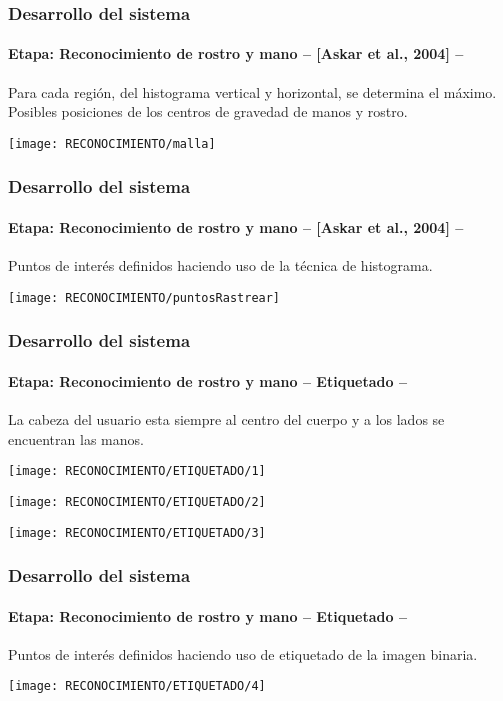\documentclass[xcolor=dvipsnames]{beamer}
\begin{document}
	\begin{frame}
		\transdissolve
		\frametitle{Desarrollo del sistema}
		\framesubtitle{Etapa: Reconocimiento de rostro y mano -- {[}Askar et al., 2004{]} --}
		{\small{Para cada región, del histograma vertical y horizontal, se determina el máximo. Posibles posiciones de los centros de gravedad de manos y rostro.}}
		\begin{center}
			\texttt{[image: RECONOCIMIENTO/malla]}
		\end{center}
	\end{frame}

	\begin{frame}
		\transdissolve
		\frametitle{Desarrollo del sistema}
		\framesubtitle{Etapa: Reconocimiento de rostro y mano -- {[}Askar et al., 2004{]} --}
		{\small{Puntos de interés definidos haciendo uso de la técnica de histograma.}}
		\begin{center}
			\texttt{[image: RECONOCIMIENTO/puntosRastrear]}
		\end{center}
	\end{frame}

	\begin{frame}
		\transdissolve
		\frametitle{Desarrollo del sistema}
		\framesubtitle{Etapa: Reconocimiento de rostro y mano -- Etiquetado --}
		{\small{La cabeza del usuario esta siempre al centro del cuerpo y a los lados se encuentran las manos.}}
		\begin{center}
			\begin{minipage}[c]{.47\textwidth}
				\begin{center}
				\texttt{[image: RECONOCIMIENTO/ETIQUETADO/1]}
				\end{center}
			\end{minipage}
			\begin{minipage}[c]{.47\textwidth}
				\begin{center}
				\texttt{[image: RECONOCIMIENTO/ETIQUETADO/2]}
				\end{center}
			\end{minipage}
			\texttt{[image: RECONOCIMIENTO/ETIQUETADO/3]}
		\end{center}
	\end{frame}

	\begin{frame}
		\transdissolve
		\frametitle{Desarrollo del sistema}
		\framesubtitle{Etapa: Reconocimiento de rostro y mano -- Etiquetado --}
		{\small{Puntos de interés definidos haciendo uso de etiquetado de la imagen binaria.}}
		\begin{center}
			\texttt{[image: RECONOCIMIENTO/ETIQUETADO/4]}
		\end{center}
	\end{frame}	
\end{document}
